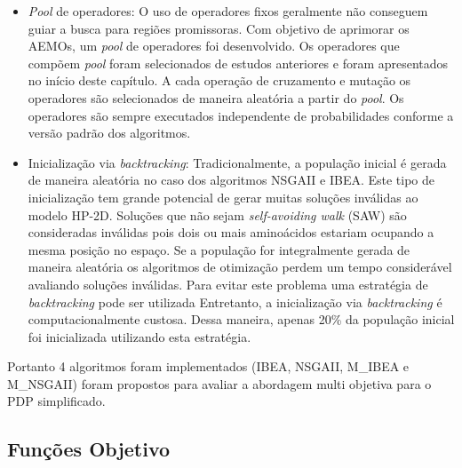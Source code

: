  
 \begin{itemize}
 		
		\item \textit{Pool} de operadores: O uso de operadores fixos geralmente não conseguem guiar a busca para regiões promissoras. Com objetivo de aprimorar os AEMOs, um \textit{pool} de operadores foi desenvolvido. Os operadores que compõem \textit{pool} foram selecionados de estudos anteriores e foram apresentados no início deste capítulo. A cada operação de cruzamento e mutação os operadores são selecionados de maneira aleatória a partir do \textit{pool}. Os operadores são sempre executados independente de probabilidades conforme a versão padrão dos algoritmos. 
	
		
		\item Inicialização via \textit{backtracking}: Tradicionalmente, a população inicial é gerada de maneira aleatória no caso dos algoritmos NSGAII e IBEA. Este tipo de inicialização tem grande potencial de gerar muitas soluções inválidas ao  modelo HP-2D. Soluções que não sejam \textit{self-avoiding walk} (SAW) são consideradas inválidas pois dois ou mais aminoácidos estariam ocupando a mesma posição no espaço. Se a população for integralmente gerada de maneira aleatória os algoritmos de otimização perdem um tempo considerável avaliando soluções inválidas. Para evitar este problema uma estratégia de \textit{backtracking} pode ser utilizada Entretanto, a inicialização via \textit{backtracking} é computacionalmente custosa. Dessa maneira, apenas 20\% da população inicial foi inicializada utilizando esta estratégia.

\end{itemize}

Portanto 4 algoritmos foram implementados (IBEA, NSGAII, M\_IBEA e M\_NSGAII) foram propostos para avaliar a abordagem multi objetiva para o PDP simplificado.


\subsection{Funções Objetivo}


